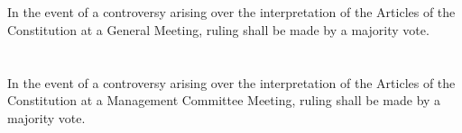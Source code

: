 
\section{}
In the event of a controversy arising over the interpretation of the Articles of the Constitution at a General Meeting, ruling shall be made by a majority vote.

\section{}
In the event of a controversy arising over the interpretation of the Articles of the Constitution at a Management Committee Meeting, ruling shall be made by a majority vote.
